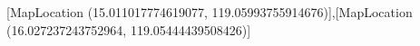 [MapLocation (15.011017774619077, 119.05993755914676)],[MapLocation (16.027237243752964, 119.05444439508426)]